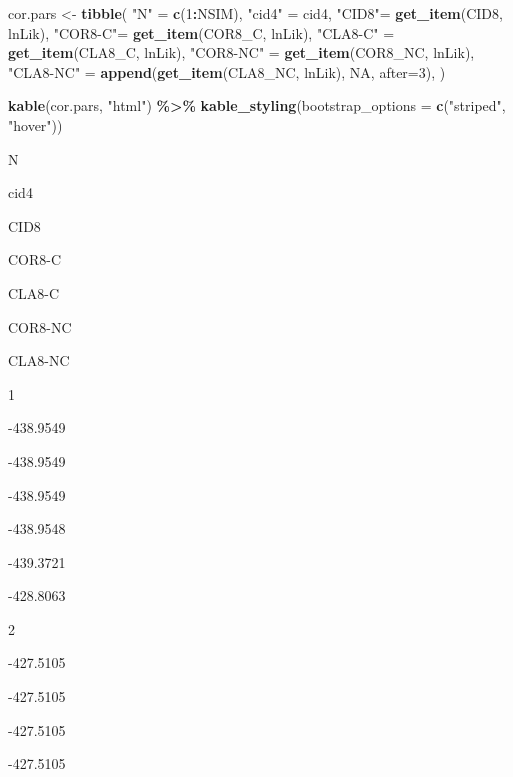 \documentclass[
]{article}
\newenvironment{Shaded}{\begin{snugshade}}{\end{snugshade}}
\newcommand{\AttributeTok}[1]{\textcolor[rgb]{0.13,0.29,0.53}{#1}}
\newcommand{\ConstantTok}[1]{\textcolor[rgb]{0.56,0.35,0.01}{#1}}
\newcommand{\DecValTok}[1]{\textcolor[rgb]{0.00,0.00,0.81}{#1}}
\newcommand{\FunctionTok}[1]{\textcolor[rgb]{0.13,0.29,0.53}{\textbf{#1}}}
\newcommand{\NormalTok}[1]{#1}
\newcommand{\OtherTok}[1]{\textcolor[rgb]{0.56,0.35,0.01}{#1}}
\newcommand{\SpecialCharTok}[1]{\textcolor[rgb]{0.81,0.36,0.00}{\textbf{#1}}}
\newcommand{\StringTok}[1]{\textcolor[rgb]{0.31,0.60,0.02}{#1}}
\begin{document}
\begin{Shaded}
\begin{Highlighting}[]
\NormalTok{cor.pars }\OtherTok{\textless{}{-}} \FunctionTok{tibble}\NormalTok{(}
\StringTok{"N"} \OtherTok{=} \FunctionTok{c}\NormalTok{(}\DecValTok{1}\SpecialCharTok{:}\NormalTok{NSIM),}
\StringTok{"cid4"} \OtherTok{=}\NormalTok{ cid4,}
\StringTok{"CID8"}\OtherTok{=} \FunctionTok{get\_item}\NormalTok{(CID8, }\StringTok{\textquotesingle{}lnLik\textquotesingle{}}\NormalTok{),}
\StringTok{"COR8{-}C"}\OtherTok{=} \FunctionTok{get\_item}\NormalTok{(COR8\_C, }\StringTok{\textquotesingle{}lnLik\textquotesingle{}}\NormalTok{),}
\StringTok{"CLA8{-}C"} \OtherTok{=} \FunctionTok{get\_item}\NormalTok{(CLA8\_C, }\StringTok{\textquotesingle{}lnLik\textquotesingle{}}\NormalTok{),}
\StringTok{"COR8{-}NC"} \OtherTok{=} \FunctionTok{get\_item}\NormalTok{(COR8\_NC, }\StringTok{\textquotesingle{}lnLik\textquotesingle{}}\NormalTok{),}
\StringTok{"CLA8{-}NC"} \OtherTok{=} \FunctionTok{append}\NormalTok{(}\FunctionTok{get\_item}\NormalTok{(CLA8\_NC, }\StringTok{\textquotesingle{}lnLik\textquotesingle{}}\NormalTok{), }\ConstantTok{NA}\NormalTok{, }\AttributeTok{after=}\DecValTok{3}\NormalTok{),}
\NormalTok{)}

\FunctionTok{kable}\NormalTok{(cor.pars, }\StringTok{"html"}\NormalTok{) }\SpecialCharTok{\%\textgreater{}\%}
  \FunctionTok{kable\_styling}\NormalTok{(}\AttributeTok{bootstrap\_options =} \FunctionTok{c}\NormalTok{(}\StringTok{"striped"}\NormalTok{, }\StringTok{"hover"}\NormalTok{))}
\end{Highlighting}
\end{Shaded}

N

cid4

CID8

COR8-C

CLA8-C

COR8-NC

CLA8-NC

1

-438.9549

-438.9549

-438.9549

-438.9548

-439.3721

-428.8063

2

-427.5105

-427.5105

-427.5105

-427.5105
\end{document}
